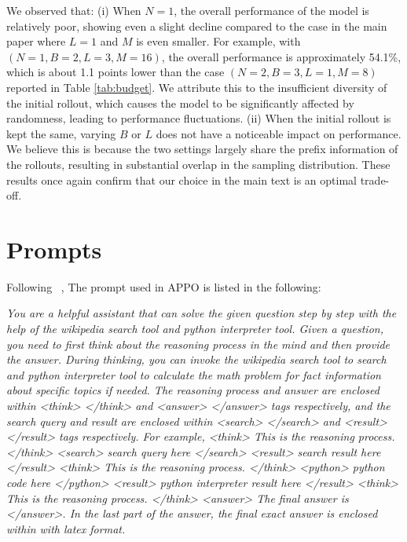 \documentclass{article}
\begin{document}
We observed that: (i) When $N=1$, the overall performance of the model is relatively poor, showing even a slight decline compared to the case in the main paper where $L=1$ and $M$ is even smaller. For example, with $(N=1, B=2, L=3, M=16)$, the overall performance is approximately 54.1\%, which is about 1.1 points lower than the case $(N=2, B=3, L=1, M=8)$ reported in Table \ref{tab:budget}. We attribute this to the insufficient diversity of the initial rollout, which causes the model to be significantly affected by randomness, leading to performance fluctuations. (ii) When the initial rollout is kept the same, varying $B$ or $L$ does not have a noticeable impact on performance. We believe this is because the two settings largely share the prefix information of the rollouts, resulting in substantial overlap in the sampling distribution. These results once again confirm that our choice in the main text is an optimal trade-off.



\section{Prompts}\label{appx:f} 
Following ~\cite{dong2025agentic}, The prompt used in APPO is listed in the following:

\begin{tcolorbox}[
  colback=gray!10,     %
  colframe=black,      %
  boxrule=1pt,         %
  arc=2mm,             %
  left=4pt,right=4pt,top=4pt,bottom=4pt, %
] 

 \textit{You are a helpful assistant that can solve the given question step by step with the help of the wikipedia search tool and python interpreter tool.  
Given a question, you need to first think about the reasoning process in the mind and then provide the answer. 
During thinking, you can invoke the wikipedia search tool to search and python interpreter tool to calculate the math problem for fact information about specific topics if needed. 
The reasoning process and answer are enclosed within <think> </think> and <answer> </answer> tags respectively,  
and the search query and result are enclosed within <search> </search> and <result> </result> tags respectively.  
For example, <think> This is the reasoning process. </think> <search> search query here </search> <result> search result here </result>  
<think> This is the reasoning process. </think> <python> python code here </python> <result> python interpreter result here </result> 
<think> This is the reasoning process. </think> <answer> The final answer is    </answer>.  
In the last part of the answer, the final exact answer is enclosed within \boxed{} with latex format. }
 
\end{tcolorbox}
\end{document}
